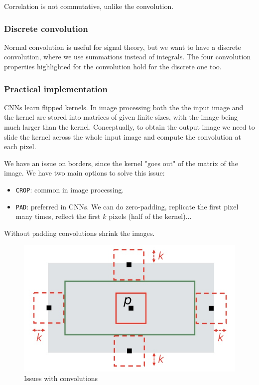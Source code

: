 \documentclass{article}
\begin{document}
Correlation is not commutative, unlike the convolution.

\subsubsection{Discrete convolution}

Normal convolution is useful for signal theory, but we want to have a discrete convolution, where we use summations instead of integrals.
The four convolution properties highlighted for the convolution hold for the discrete one too.

\subsubsection{Practical implementation}
CNNs learn flipped kernels.
In image processing both the the input image and the kernel are stored into matrices of given finite sizes, with the image being much larger than the kernel.
Conceptually, to obtain the output image we need to slide the kernel across the whole input image and compute the convolution at each pixel.

We have an issue on borders, since the kernel "goes out" of the matrix of the image.
We have two main options to solve this issue:
\begin{itemize}
  \item \verb|CROP|: common in image processing.
  \item \verb|PAD|: preferred in CNNs. We can do zero-padding, replicate the first pixel many times, reflect the first $k$ pixels (half of the kernel)...
\end{itemize}

Without padding convolutions shrink the images.

\begin{figure}[htbp]
  \centering
  \includegraphics[width=0.7\linewidth]{./img/convolution_visualization.jpg}
  \caption{Issues with convolutions}
  \label{fig:convolution_visualization}
\end{figure}
\end{document}
